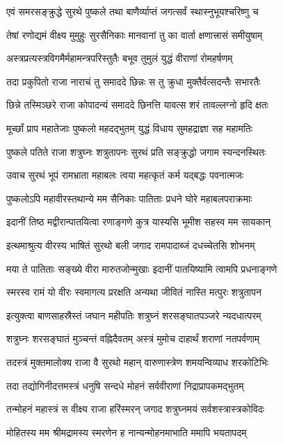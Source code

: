 \twolineshloka
{एवं समरसङ्क्रुद्धे सुरथे पुष्कले तथा}
{बाणैर्व्याप्तं जगत्सर्वं स्थास्नुभूयश्चरिष्णु च}%

\twolineshloka
{तेषां रणोद्यमं वीक्ष्य मुमुहुः सुरसैनिकाः}
{मानवानां तु का वार्ता क्षणात्त्रासं समीयुषाम्}%

\twolineshloka
{अस्त्रप्रत्यस्त्रविगमैर्महामन्त्रपरिस्तुतैः}
{बभूव तुमुलं युद्धं वीराणां रोमहर्षणम्}%

\twolineshloka
{तदा प्रकुपितो राजा नाराचं तु समाददे}
{छिन्नः स तु क्रुधा मुक्तैर्वत्सदन्तैः सभारतैः}%

\twolineshloka
{छिन्ने तस्मिञ्छरे राजा कोपादन्यं समाददे}
{छिनत्ति यावत्स शरं तावल्लग्नो हृदि क्षतः}%

\twolineshloka
{मूर्च्छां प्राप महातेजाः पुष्कलो महदद्भुतम्}
{युद्धं विधाय सुमहद्राज्ञा सह महामतिः}%

\twolineshloka
{पुष्कले पतिते राजा शत्रुघ्नः शत्रुतापनः}
{सुरथं प्रति सङ्क्रुद्धो जगाम स्यन्दनस्थितः}%

\twolineshloka
{उवाच सुरथं भूपं रामभ्राता महाबलः}
{त्वया महत्कृतं कर्म यद्बद्धः पवनात्मजः}%

\twolineshloka
{पुष्कलोऽपि महावीरस्तथान्ये मम सैनिकाः}
{पातिताः प्रधने घोरे महाबलपराक्रमाः}%

\twolineshloka
{इदानीं तिष्ठ मद्वीरान्पातयित्वा रणाङ्गणे}
{कुत्र यास्यसि भूमीश सहस्व मम सायकान्}%

\twolineshloka
{इत्थमाश्रुत्य वीरस्य भाषितं सुरथो बली}
{जगाद रामपादाब्जं दधच्चेतसि शोभनम्}%

\twolineshloka
{मया ते पातिताः सङ्ख्ये वीरा मारुतजोन्मुखाः}
{इदानीं पातयिष्यामि त्वामपि प्रधनाङ्गणे}%

\twolineshloka
{स्मरस्व रामं यो वीरः स्वमागत्य प्ररक्षति}
{अन्यथा जीवितं नास्ति मत्पुरः शत्रुतापन}%

\twolineshloka
{इत्युक्त्वा बाणसाहस्रैस्तं जघान महीपतिः}
{शत्रुघ्नं शरसङ्घातपञ्जरे न्यदधात्परम्}%

\twolineshloka
{शत्रुघ्नः शरसङ्घातं मुञ्चन्तं वह्निदैवतम्}
{अस्त्रं मुमोच दाहार्थं शराणां नतपर्वणाम्}%

\twolineshloka
{तदस्त्रं मुक्तमालोक्य राजा वै सुरथो महान्}
{वारुणास्त्रेण शमयन्विव्याध शरकोटिभिः}%

\twolineshloka
{तदा तद्योगिनीदत्तमस्त्रं धनुषि सन्दधे}
{मोहनं सर्ववीराणां निद्राप्रापकमद्भुतम्}%

\twolineshloka
{तन्मोहनं महास्त्रं स वीक्ष्य राजा हरिंस्मरन्}
{जगाद शत्रुघ्नमयं सर्वशस्त्रास्त्रकोविदः}%

\twolineshloka
{मोहितस्य मम श्रीमद्रामस्य स्मरणेन ह}
{नान्यन्मोहनमाभाति ममापि भयतापदम्}%

